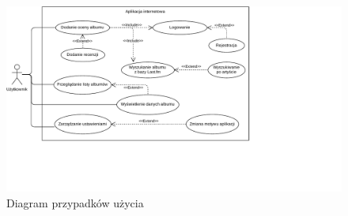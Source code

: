	\begin{figure}[ht]
		\centering
			\includegraphics[width=\linewidth]{rys02/useCase.pdf}
		 \caption{Diagram przypadków użycia}
		 \label{fig:useCase}
	\end{figure}

